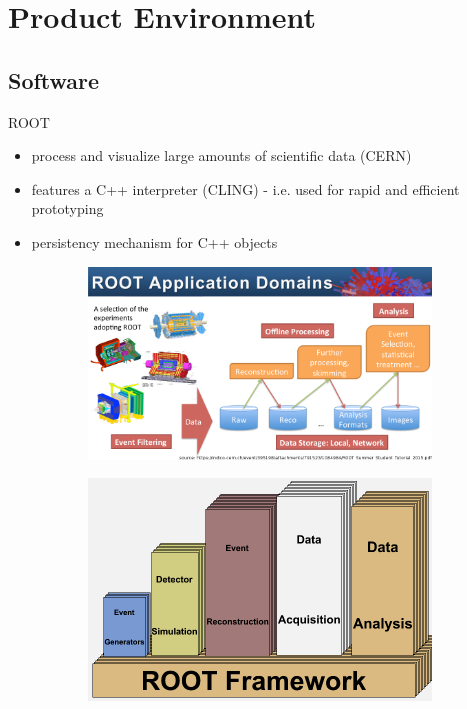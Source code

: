 \section{Product Environment}

\subsection{Software}
\begin{frame}{ROOT}
    \begin{itemize}
      \item process and visualize large amounts of scientific data (CERN)
      \item features a C++ interpreter (CLING) - i.e. used for rapid and efficient prototyping
      \item persistency mechanism for C++ objects
    \end{itemize}


  \begin{figure}[htb]
    \centering
    \begin{subfigure}[b]{0.5\textwidth}
      \includegraphics[width=0.97\linewidth, keepaspectratio]{./resources/root_application_domains.png}
      \nocite{cern:root:tut}
    \end{subfigure}%
    \begin{subfigure}[b]{0.5\textwidth}
      \includegraphics[width=0.97\linewidth, keepaspectratio]{./resources/root_application_domains2.png}
      \nocite{cern:root:domains}
    \end{subfigure}
  \end{figure}
\end{frame}

